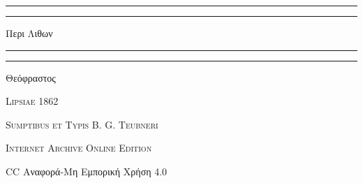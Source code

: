 \documentclass[a4paper, 11pt, oneside, polutonikogreek, german]{article}
\begin{document}
\begin{titlepage} %
	\centering %


	\rule{\textwidth}{1.6pt}\vspace*{-\baselineskip}\vspace*{2pt} %
	\rule{\textwidth}{0.4pt} %
	
	\vspace{1\baselineskip} %
	
	{\Huge Περι Λιθων}
	
	\vspace{1\baselineskip} %

	\rule{\textwidth}{0.4pt}\vspace*{-\baselineskip}\vspace{3.2pt} %
	\rule{\textwidth}{1.6pt} %
	
	\vspace{1\baselineskip} %
	
	
	{\Large Θεόφραστος}
 
        \vspace{0.5\baselineskip}
	
	\vspace*{1\baselineskip} %
	
        {\scshape \normalsize } %

        \vspace*{\fill}    

	\vspace{1\baselineskip}

	{\small\scshape Lipsiae 1862}
	
	{\small\scshape{Sumptibus et Typis B. G. Teubneri}}
	
	\vspace{0.5\baselineskip} %

        {\scshape Internet Archive Online Edition}%
    
	{\small CC Αναφορά-Μη Εμπορική Χρήση 4.0} %
\end{titlepage}
\end{document}
